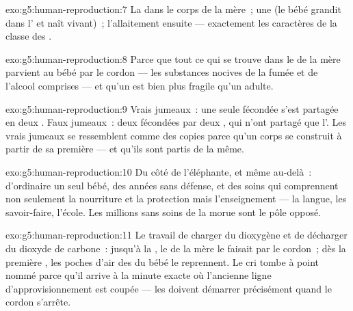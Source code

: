 \begin{solution}{exo:g5:human-reproduction:7}
La  dans le corps de la mère~; une   (le
bébé grandit dans l' et naît vivant)~; l'allaitement ensuite
--- exactement les caractères de la classe des .
\end{solution}

\begin{solution}{exo:g5:human-reproduction:8}
Parce que tout ce qui se trouve dans le  de la mère parvient au
bébé par le cordon --- les substances nocives de la fumée et de
l'alcool comprises --- et qu'un  est bien plus fragile qu'un
adulte.
\end{solution}

\begin{solution}{exo:g5:human-reproduction:9}
Vrais jumeaux~: une seule  fécondée s'est partagée en
deux . Faux jumeaux~: deux  fécondées par deux
, qui n'ont partagé que l'. Les vrais jumeaux se
ressemblent comme des copies parce qu'un corps se construit à partir
de sa première  --- et qu'ils sont partis de la même.
\end{solution}

\begin{solution}{exo:g5:human-reproduction:10}
Du côté de l'éléphante, et même au-delà~: d'ordinaire un seul bébé,
des années sans défense, et des soins qui comprennent non seulement
la nourriture et la protection mais l'enseignement --- la langue,
les savoir-faire, l'école. Les millions sans soins de la morue sont
le pôle opposé.
\end{solution}

\begin{solution}{exo:g5:human-reproduction:11}
Le travail de charger du dioxygène et de décharger du dioxyde de
carbone~: jusqu'à la , le  de la mère le faisait par le
cordon~; dès la première , les poches d'air des 
du bébé le reprennent. Le cri tombe à point nommé parce qu'il arrive
à la minute exacte où l'ancienne ligne d'approvisionnement est
coupée --- les  doivent démarrer précisément quand le cordon
s'arrête.
\end{solution}
